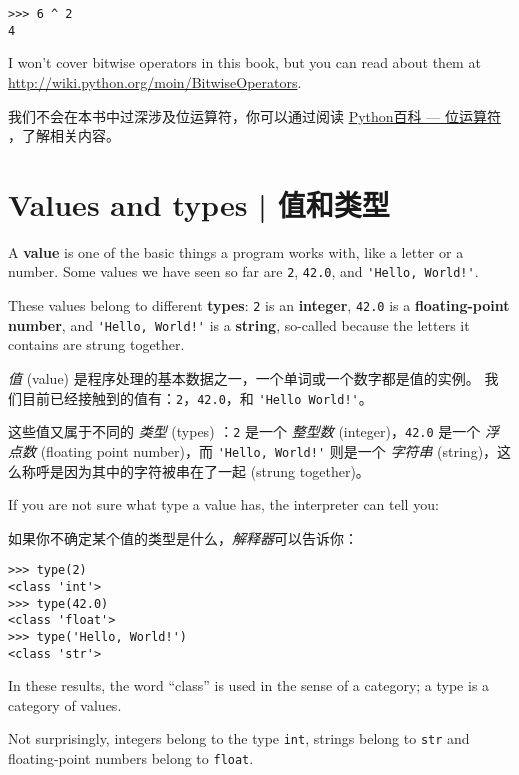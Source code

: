 \begin{lstlisting}
>>> 6 ^ 2
4
\end{lstlisting}
%
I won't cover
bitwise operators in this book, but you can read about
them at \url{http://wiki.python.org/moin/BitwiseOperators}.

我们不会在本书中过深涉及位运算符，你可以通过阅读 \href{http://wiki.python.org/moin/BitwiseOperators}{Python百科 --- 位运算符} ，了解相关内容。
  
  

\section{Values and types  |  值和类型}
    


A {\bf value} is one of the basic things a program works with, like a
letter or a number.  Some values we have seen so far are {\tt 2},
{\tt 42.0}, and \verb"'Hello, World!'".

These values belong to different {\bf types}:
{\tt 2} is an {\bf integer}, {\tt 42.0} is a {\bf floating-point number},
and \verb"'Hello, World!'" is a {\bf string},
so-called because the letters it contains are strung together.

\emph{值} (value) 是程序处理的基本数据之一，一个单词或一个数字都是值的实例。 我们目前已经接触到的值有：\lstinline{2}，\lstinline{42.0}，和 \lstinline{'Hello World!'}。

这些值又属于不同的 \emph{类型} (types) ：\lstinline{2} 是一个 \emph{整型数} (integer)，\lstinline{42.0} 是一个 \emph{浮点数} (floating point number)，而 \lstinline{'Hello, World!'}  则是一个  \emph{字符串} (string)，这么称呼是因为其中的字符被串在了一起 (strung together)。

If you are not sure what type a value has, the interpreter can
tell you:

如果你不确定某个值的类型是什么，\emph{解释器}可以告诉你：

\begin{lstlisting}
>>> type(2)
<class 'int'>
>>> type(42.0)
<class 'float'>
>>> type('Hello, World!')
<class 'str'>
\end{lstlisting}
%
In these results, the word ``class'' is used in the sense of
a category; a type is a category of values.

Not surprisingly, integers belong to the type {\tt int},
strings belong to {\tt str} and floating-point
numbers belong to {\tt float}.
    
    

